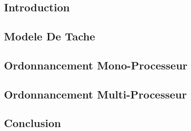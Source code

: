 \chapter{}
\section{Introduction}
\section{Modele De Tache}
\section{Ordonnancement Mono-Processeur}
\section{Ordonnancement Multi-Processeur}
\section{Conclusion}
